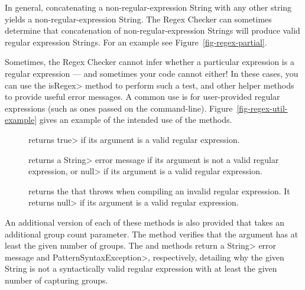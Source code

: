 In general, concatenating a non-regular-expression String with any other
string yields a non-regular-expression String.  The Regex Checker can
sometimes determine that concatenation of non-regular-expression Strings
will produce valid regular expression Strings. For an example see
Figure~\ref{fig-regex-partial}.



Sometimes, the Regex Checker cannot infer whether a particular expression
is a regular expression --- and sometimes your code cannot either!  In
these cases, you can use the \<isRegex> method to perform such a test, and
other helper methods to provide useful error messages.  A
common use is for user-provided regular expressions (such as ones passed
on the command-line).
Figure~\ref{fig-regex-util-example} gives an
example of the intended use of the  methods.

\begin{description}

\item[]
  returns \<true> if its argument is a valid regular expression.

\item[]
  returns a \<String> error message if its argument is not a valid regular
  expression, or \<null> if its argument is a valid regular expression.

\item[]
  returns the
  that 
  throws when compiling an invalid regular expression.  It returns \<null>
  if its argument is a valid regular expression.

\end{description}

An additional version of each of these methods is also provided that takes
an additional group count parameter. The
 method
verifies that the argument has at least the given number of groups. The
 and
methods return a \<String> error message and \<Pattern\-Syntax\-Exception>,
respectively, detailing why the given String is not a syntactically valid
regular expression with at least the given number of capturing groups.


